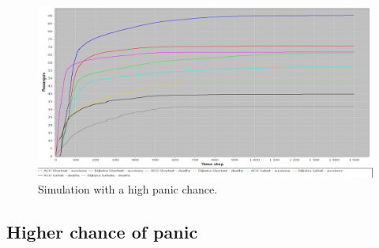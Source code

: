 



\begin{figure} [h]
\centering
\hspace*{-1.0in}
\includegraphics[scale=0.35]{images/Graph-using-200-rounds-140-passangers-and-high-panic.png}
\caption{Simulation with a high panic chance.}
\label{fig:celebHPanic}
\end{figure}

\subsection{Higher chance of panic}

